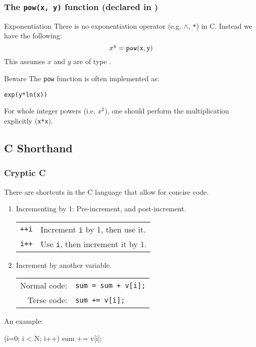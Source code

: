\documentclass[smaller,table]{beamer} %
\begin{document}
\begin{frame}
\frametitle{The {\tt pow(x, y)} function (declared in )}
\begin{block}{Exponentiation}
There is no exponentiation operator (e.g. $\wedge$, {\tt **}) in C. Instead we have the following:
$$x^y = \mathrm{\tt pow(x,y)}$$
This assumes $x$ and $y$ are of type .
\end{block}

\begin{alertblock}{Beware}
The {\tt pow} function is often implemented as:
\begin{center}{\tt exp(y*ln(x))}\end{center}
For whole integer powers (i.e. $x^2$), one should perform the multiplication explicitly ({\tt x*x}).
\end{alertblock}
\end{frame}

\subsection{C Shorthand}
\begin{frame}[fragile]
\frametitle{Cryptic C}
There are shortcuts in the C language that allow for concise code.
\begin{enumerate}
\item Incrementing by 1: Pre-increment, and post-increment.\\
\begin{tabular}{l l}
\tt ++i& Increment {\tt i} by 1, then use it.\\
\tt i++& Use {\tt i}, then increment it by 1.
\end{tabular}
\item Increment by another variable.\\
\begin{tabular}{r l}
Normal code:&\tt sum = sum + v[i];\\
Terse code:&\tt sum += v[i];
\end{tabular}
\end{enumerate}
An example:\\
\begin{semiverbatim}
    (i=0; i < N; i++)
      sum += v[i];
\end{semiverbatim}
\end{frame}
\end{document}
